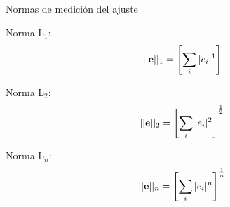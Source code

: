 \documentclass[aspectratio=169]{beamer}
\begin{document}
\begin{frame}
 {Normas de medición del ajuste}
 
 {
 \color{black}
 Norma L$_1$:
 \begin{equation*}
  ||\textnormal{\bf e}||_1 = \left[ \sum_i |e_i|^1 \right]
 \end{equation*}

 Norma L$_2$:
 \begin{equation*}
  ||\textnormal{\bf e}||_2 = \left[ \sum_i |e_i|^2 \right] ^{\frac{1}{2}}
 \end{equation*}
 
 Norma L$_n$:
 \begin{equation*}
  ||\textnormal{\bf e}||_n = \left[ \sum_i |e_i|^n \right] ^{\frac{1}{n}}
 \end{equation*}
}
 
\end{frame}


\begin{frame}

    
        

\end{frame}
\end{document}

